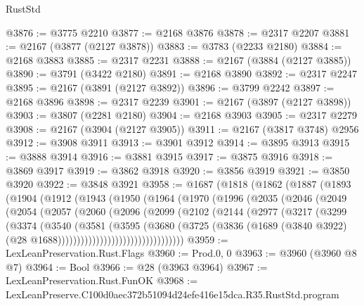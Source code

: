 \begin{lexlean}{RustStd}
\begin{coremodule}
@3876 := @3775 @2210
@3877 := @2168 @3876
@3878 := @2317 @2207
@3881 := @2167 (@3877 (@2127 @3878))
@3883 := @3783 (@2233 @2180)
@3884 := @2168 @3883
@3885 := @2317 @2231
@3888 := @2167 (@3884 (@2127 @3885))
@3890 := @3791 (@3422 @2180)
@3891 := @2168 @3890
@3892 := @2317 @2247
@3895 := @2167 (@3891 (@2127 @3892))
@3896 := @3799 @2242
@3897 := @2168 @3896
@3898 := @2317 @2239
@3901 := @2167 (@3897 (@2127 @3898))
@3903 := @3807 (@2281 @2180)
@3904 := @2168 @3903
@3905 := @2317 @2279
@3908 := @2167 (@3904 (@2127 @3905))
@3911 := @2167 (@3817 @3748) @2956
@3912 := @3908 @3911
@3913 := @3901 @3912
@3914 := @3895 @3913
@3915 := @3888 @3914
@3916 := @3881 @3915
@3917 := @3875 @3916
@3918 := @3869 @3917
@3919 := @3862 @3918
@3920 := @3856 @3919
@3921 := @3850 @3920
@3922 := @3848 @3921
@3958 := @1687
    (@1818
      (@1862
        (@1887
          (@1893
            (@1904
              (@1912
                (@1943
                  (@1950
                    (@1964
                      (@1970
                        (@1996
                          (@2035
                            (@2046
                              (@2049
                                (@2054
                                  (@2057
                                    (@2060
                                      (@2096
                                        (@2099
                                          (@2102
                                            (@2144
                                              (@2977
                                                (@3217
                                                  (@3299
                                                    (@3374
                                                      (@3540
                                                        (@3581
                                                          (@3595
                                                            (@3680
                                                              (@3725
                                                                (@3836
                                                                  (@1689
                                                                    (@3840 @3922)
                                                                    (@28
                                                                      @1688)))))))))))))))))))))))))))))))))
@3959 := LexLeanPreservation.Rust.Flags
@3960 := Prod.{0, 0}
@3963 := @3960 (@3960 @8 @7)
@3964 := Bool
@3966 := @28 (@3963 @3964)
@3967 := LexLeanPreservation.Rust.FunOK
@3968 := LexLeanPreserve.C100d0aec372b51094d24efe416e15dca.R35.RustStd.program

\end{coremodule}
\end{lexlean}
